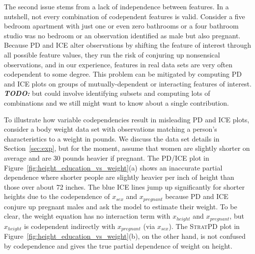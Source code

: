 \documentclass[12pt]{article}
\newcommand{\secref}[1]{Section~\ref{#1}}
\newcommand{\figref}[1]{Figure~\ref{#1}}
\newcommand{\cut}[1]{}
\newcommand{\todo}[1]{{\bf\em TODO:} {{#1}}}
\newcommand{\spd}{\fontfamily{cmr}\textsc{\small StratPD}}
\begin{document}
The second issue stems from a lack of independence between features.  In a nutshell, not every combination of codependent features is valid. Consider a five bedroom apartment with just one or even zero bathrooms or a four bathroom studio was no bedroom or an observation identified as male but also pregnant.  Because PD and ICE alter observations by shifting the feature of interest through all possible feature values, they run the risk of conjuring up nonsensical observations, and in our experience, features in real data sets are very often codependent to some degree. This problem can be mitigated by computing PD and ICE plots on groups of mutually-dependent or interacting features of interest. \todo{but could involve identifying subsets and computing lots of combinations and we still might want to know about a single contribution.}

\cut{
def toy_weight_data(n):
    df = pd.DataFrame()
    nmen = n//2
    nwomen = n//2
    df['ID'] = range(100,100+n)
    df['sex'] = ['M']*nmen + ['F']*nwomen
    df.loc[df['sex']=='F','pregnant'] = np.random.randint(0,2,size=(nwomen,))
    df.loc[df['sex']=='M','pregnant'] = 0
    df.loc[df['sex']=='M','height'] = 5*12+8 + np.random.uniform(-7, +8, size=(nmen,))
    df.loc[df['sex']=='F','height'] = 5*12+5 + np.random.uniform(-4.5, +5, size=(nwomen,))
    df.loc[df['sex']=='M','education'] = 10 + np.random.randint(0,8,size=nmen)
    df.loc[df['sex']=='F','education'] = 12 + np.random.randint(0,8,size=nwomen)
    df['weight'] = 120 \
                   + (df['height']-df['height'].min()) * 10 \
                   + df['pregnant']*30 \
                   - df['education']*1.2
    df['pregnant'] = df['pregnant'].astype(bool)
    df['education'] = df['education'].astype(int)
    return df
}

To illustrate how variable codependencies result in misleading PD and ICE plots, consider a body weight data set with observations matching a person's characteristics to a weight in pounds. We discuss the data set details in \secref{sec:exp}, but for the moment, assume that women are slightly shorter on average and are 30 pounds heavier if pregnant. The PD/ICE plot in \figref{fig:height_education_vs_weight}(a) shows an inaccurate partial dependence where shorter people are slightly heavier per inch of height than those over about 72 inches. The blue ICE lines jump up significantly for shorter heights due to the codependence of $x_{sex}$ and $x_{pregnant}$ because PD and ICE conjure up pregnant males and ask the model to estimate their weight.  To be clear, the weight equation has no interaction term with $x_{height}$ and $x_{pregnant}$, but $x_{height}$ is codependent indirectly with $x_{pregnant}$ (via $x_{sex}$).  The \spd{} plot in \figref{fig:height_education_vs_weight}(b), on the other hand, is not confused by codependence and gives the true partial dependence of weight on height. 
\end{document}
